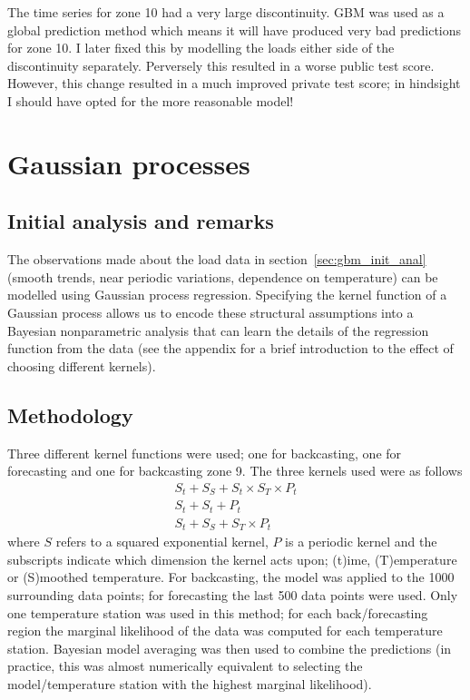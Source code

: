 \documentclass[preprint,authoryear,12pt]{elsarticle}
\begin{document}
The time series for zone 10 had a very large discontinuity.
GBM was used as a global prediction method which means it will have produced very bad predictions for zone 10.
I later fixed this by modelling the loads either side of the discontinuity separately.
Perversely this resulted in a worse public test score.
However, this change resulted in a much improved private test score; in hindsight I should have opted for the more reasonable model!

\section{Gaussian processes}

\subsection{Initial analysis and remarks}

The observations made about the load data in section~\ref{sec:gbm_init_anal} (\ie smooth trends, near periodic variations, dependence on temperature) can be modelled using Gaussian process regression.
Specifying the kernel function of a Gaussian process allows us to encode these structural assumptions into a Bayesian nonparametric analysis that can learn the details of the regression function from the data (see the appendix for a brief introduction to the effect of choosing different kernels).

\subsection{Methodology}

Three different kernel functions were used; one for backcasting, one for forecasting and one for backcasting zone 9.
The three kernels used were as follows
\begin{eqnarray}
S_t + S_S + S_t \times S_T \times P_t \label{eqn:kernel1}\\
S_t + S_t + P_t \label{eqn:kernel2}\\
S_t + S_S + S_T \times P_t\label{eqn:kernel3}
\end{eqnarray}
where $S$ refers to a squared exponential kernel, $P$ is a periodic kernel and the subscripts indicate which dimension the kernel acts upon; (t)ime, (T)emperature or (S)moothed temperature.
For backcasting, the model was applied to the 1000 surrounding data points; for forecasting the last 500 data points were used.
Only one temperature station was used in this method; for each back/forecasting region the marginal likelihood of the data was computed for each temperature station.
Bayesian model averaging \citep[e.g.][]{Hoeting1999} was then used to combine the predictions (in practice, this was almost numerically equivalent to selecting the model/temperature station with the highest marginal likelihood).
\end{document}
